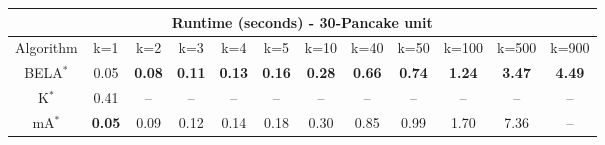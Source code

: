 \begin{tabular}{c|ccccccccccc}\toprule
\multicolumn{12}{c}{Runtime (seconds) - 30-Pancake unit}\\ \midrule
Algorithm & k=1 & k=2 & k=3 & k=4 & k=5 & k=10 & k=40 & k=50 & k=100 & k=500 & k=900 \\ \midrule
BELA$^*$ & 0.05 & \textbf{0.08} & \textbf{0.11} & \textbf{0.13} & \textbf{0.16} & \textbf{0.28} & \textbf{0.66} & \textbf{0.74} & \textbf{1.24} & \textbf{3.47} & \textbf{4.49} \\
K$^*$ & 0.41 & -- & -- & -- & -- & -- & -- & -- & -- & -- & -- \\
mA$^*$ & \textbf{0.05} & 0.09 & 0.12 & 0.14 & 0.18 & 0.30 & 0.85 & 0.99 & 1.70 & 7.36 & -- \\ \bottomrule 
\end{tabular}
